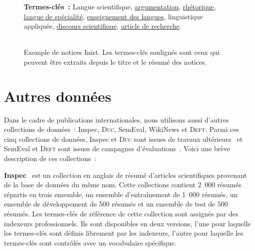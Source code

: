 \begin{figure}
{{          \textbf{Termes-clés~:} Langue scientifique,
          \underline{argumentation},  \underline{rhétorique},  \underline{langue
          de spécialité}, \underline{enseignement des langues}, linguistique
          appliquée,  \underline{discours scientifique},  \underline{article de
          recherche}. 
        }
      }
      ~\\~\\
      \caption{Exemple de notices Inist. Les termes-clés soulignés sont ceux qui
               peuvent être extraits depuis le titre et le résumé des notices.
               \label{fig:exemple_notice_inist}}
    \end{figure}

  \section{Autres données}
    Dans le cadre de publications internationales, nous utilisons aussi d'autres
    collections de données~: Inspec, \textsc{Duc}, SemEval, WikiNews et
    \textsc{Deft}. Parmi ces cinq collections de données, Inspec et
    \textsc{Duc} sont issues de travaux
    ultérieurs~\citep{hulth2003keywordextraction,wan2008expandrank} et SemEval
    et \textsc{Deft} sont issues de campagnes
    d'évaluations~\citep{kim2010semeval,paroubek2012deft}. Voici une brève
    description de ces collections~:

    \textbf{Inspec}~\citep{hulth2003keywordextraction} est un collection en
    anglais de résumé d'articles scientifiques provenant de la base de données
    du même nom. Cette collections contient 2~000 résumés répartis en trois
    ensemble, un ensemble d'entraînement de 1~000 résumés, un ensemble de
    développement de 500 résumés et un ensemble de test de 500 résumés. Les
    termes-clés de référence de cette collection sont assignés par des indexeurs
    professionnels. Ils sont disponibles en deux versions, l'une pour laquelle
    les termes-clés sont définis librement par les indexeurs, l'autre pour
    laquelle les termes-clés sont contrôlés avec un vocabulaire spécifique.

